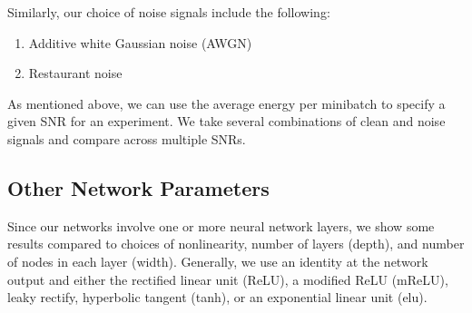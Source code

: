 Similarly, our choice of noise signals include the following:

\begin{enumerate}
    \item Additive white Gaussian noise (AWGN)
    \item Restaurant noise
\end{enumerate}

As mentioned above, we can use the average energy per minibatch to specify a given SNR for an experiment. We take several combinations of clean and noise signals and compare across multiple SNRs.

\subsection{Other Network Parameters}
Since our networks involve one or more neural network layers, we show some results compared to choices of nonlinearity, number of layers (depth), and number of nodes in each layer (width). Generally, we use an identity at the network output and either the rectified linear unit (ReLU), a modified ReLU (mReLU), leaky rectify, hyperbolic tangent (tanh), or an exponential linear unit (elu).

